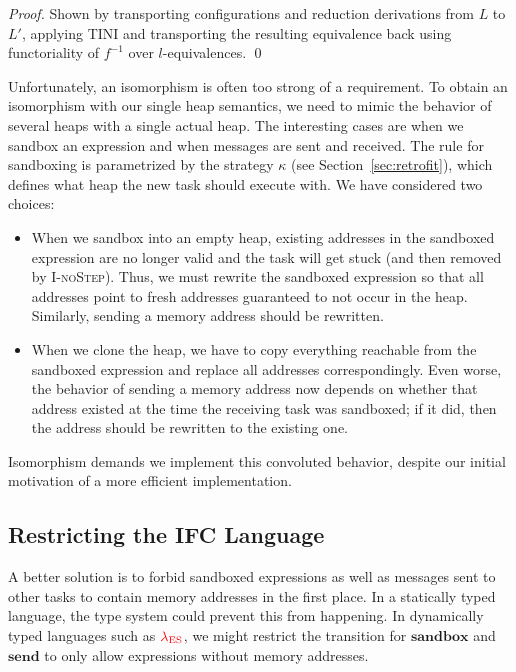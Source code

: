 \documentclass{llncs}
\newcommand{\Varid}[1]{\mathit{#1}}
\newcommand{\Red}[1]{{\color{red} #1}}
\begin{document}
\begin{proof}
  Shown by transporting configurations and reduction derivations
  from $L$ to $L'$, applying TINI and transporting the resulting
  equivalence back using functoriality of \ensuremath{\Varid{f}^{-1}} over $l$-equivalences.
  \qed
\end{proof}

Unfortunately, an isomorphism is often too strong of a requirement.
To obtain an isomorphism with our single heap semantics, we need to mimic the
behavior of several heaps with a single actual heap.
The interesting cases are when we sandbox
an expression and when messages are sent and received.
The rule for sandboxing is
parametrized by the strategy \ensuremath{\kappa} (see Section~\ref{sec:retrofit}),
which defines what heap the new task
should execute with.  We have considered two choices:

\begin{itemize}
    \item When we sandbox into an empty heap, existing addresses
in the sandboxed expression are no longer valid and the
task will get stuck (and then removed by \textsc{I-noStep}).
Thus, we must rewrite the sandboxed expression so that
all addresses point to fresh addresses
guaranteed to not occur in the heap.  Similarly,
sending a memory address should be rewritten.

\item When we clone the heap, we have to copy everything
reachable from the sandboxed expression and replace all addresses
correspondingly.  Even worse, the behavior of sending a memory address
now depends on whether that address existed at the time the receiving
task was sandboxed;  if it did, then the address should be rewritten to the
existing one.
\end{itemize}

Isomorphism demands we implement this convoluted behavior,
despite our initial motivation of a more efficient implementation.



\subsection{Restricting the IFC Language}

A better solution is to forbid sandboxed expressions as well
as messages sent to other tasks to contain memory addresses in the
first place.  In a statically typed language, the type system could
prevent this from happening.
In dynamically typed languages such as \ensuremath{\Red{\lambda_{\text{ES}}}}, we might
restrict the transition for \ensuremath{\mathbf{sandbox}} and \ensuremath{\mathbf{send}} to only allow expressions
without memory addresses.
\end{document}
